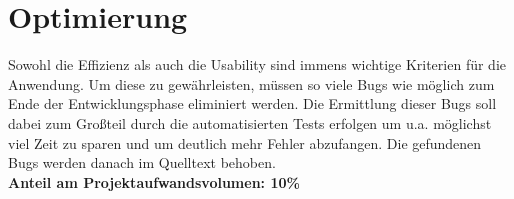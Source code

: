 \section{Optimierung}
Sowohl die Effizienz als auch die Usability sind immens wichtige Kriterien für die Anwendung. Um diese zu gewährleisten, müssen so viele Bugs wie möglich zum Ende der Entwicklungsphase eliminiert werden. Die Ermittlung dieser Bugs soll dabei zum Großteil durch die automatisierten Tests erfolgen um u.a. möglichst viel Zeit zu sparen und um deutlich mehr Fehler abzufangen. Die gefundenen Bugs werden danach im Quelltext behoben. \\
\textbf{Anteil am Projektaufwandsvolumen: 10\%}